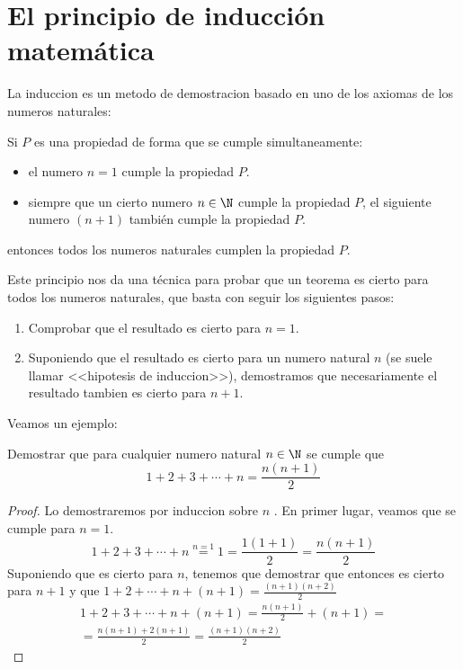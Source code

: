 \section{El principio de inducción matemática}
La induccion es un metodo de demostracion basado en uno de los axiomas de los numeros naturales:
\begin{proposition}
	Si \(P \) es una propiedad de forma que se cumple simultaneamente:
	\begin{itemize}
		\item el numero \(n = 1 \) cumple la propiedad \(P \).
		\item siempre que un cierto numero \(n \in \N \) cumple la propiedad \(P\), el siguiente numero \((n+1 )\) también cumple la propiedad \(P \).
	\end{itemize}
	entonces todos los numeros naturales cumplen la propiedad \(P \).
\end{proposition}

Este principio nos da una técnica para probar que un teorema es cierto para todos los numeros naturales, que basta con seguir los siguientes pasos:
\begin{enumerate}
	\item Comprobar que el resultado es cierto para \(n = 1\).
	\item Suponiendo que el resultado es cierto para un numero natural \(n \) (se suele llamar <<hipotesis de induccion>>), demostramos que necesariamente el resultado tambien es cierto para \(n + 1\).
\end{enumerate}

Veamos un ejemplo:
\begin{theorem}
	Demostrar que para cualquier numero natural \(n \in \N \) se cumple que
	\[
		1 + 2 + 3 + \cdots + n = \frac{n(n+1)}{2}
	\]
\end{theorem}
\begin{proof}
	Lo demostraremos por induccion sobre \(n\) . En primer lugar, veamos que se cumple para \(n = 1\).
	\[
		1 + 2 + 3 + \cdots + n \overset{n=1}{=} 1 = \frac{1(1+1)}{2} = \frac{n(n+1)}{2}
	\]
	Suponiendo que es cierto para \(n\), tenemos que demostrar que entonces es cierto para \(n + 1\) y que \(1 + 2 + \cdots + n + (n+1) = \frac{(n+1)(n+2)}{2}\)
	\begin{multline*}
		1 + 2 + 3 + \cdots + n + (n+1) = \frac{n(n+1)}{2} + (n+1) = \\
		= \frac{n(n+1)+2(n+1)}{2} = \boxed{\frac{(n+1)(n+2)}{2}}
	\end{multline*}
\end{proof}

